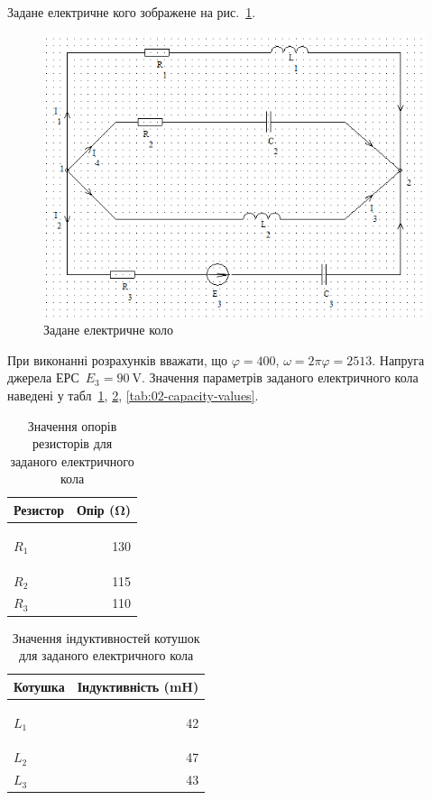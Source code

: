 \documentclass[a4paper,oneside,DIV=12,12pt]{scrartcl}
\begin{document}
		Задане електричне кого зображене на рис.~\ref{fig:02-01-scheme-full}.
		\begin{figure}[!htbp]
		\centering
			\includegraphics[height = 12\baselineskip]{assets/02-01-scheme-full.png}
		\caption{Задане електричне коло}
		\label{fig:02-01-scheme-full}
		\end{figure}
		
		При виконанні розрахунків вважати, що $\varphi = 400$, $\omega = 2 \pi \varphi = 2513$. Напруга джерела ЕРС~$E_{3} = \SI{90}{\volt}$. Значення параметрів заданого електричного кола наведені у табл~\ref{tab:02-resistance-values}, \ref{tab:02-induction-values}, \ref{tab:02-capacity-values}.
		
		\begin{longtable}{lr}
			\toprule
				Резистор & Опір (\si{\ohm})\\
			\midrule
			\endhead
			\bottomrule
			\caption{Значення опорів резисторів для заданого електричного кола}
			\endfoot
			\label{tab:02-resistance-values}
			
			$R_1$ & \num{130}\\
			$R_2$ & \num{115}\\
			$R_3$ & \num{110}\\
		\end{longtable}
		
		\begin{longtable}{lr}
			\toprule
				Котушка & Індуктивність (\si{\milli\henry})\\
			\midrule
			\endhead
			\bottomrule
			\caption{Значення індуктивностей котушок для заданого електричного кола}
			\endfoot
			\label{tab:02-induction-values}
			
			$L_1$ & \num{42}\\
			$L_2$ & \num{47}\\
			$L_3$ & \num{43}\\
		\end{longtable}
		
\end{document}
